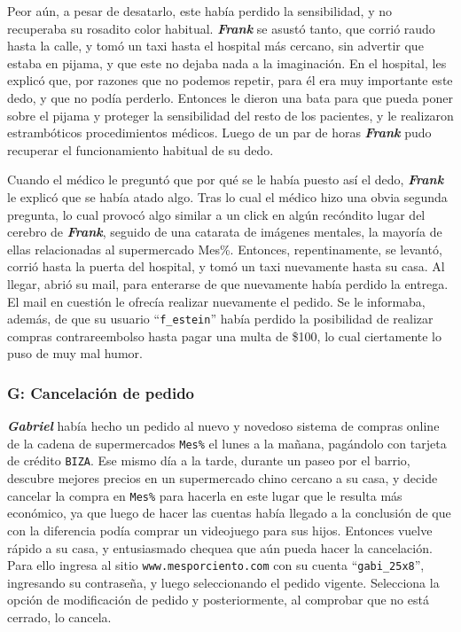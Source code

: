 Peor aún, a pesar de desatarlo, este había perdido la sensibilidad, y no
recuperaba su rosadito color habitual. \textbf{\emph{Frank}} se asustó tanto,
que corrió raudo hasta la calle, y tomó un taxi hasta el hospital más cercano,
sin advertir que estaba en pijama, y que este no dejaba nada a la imaginación.
En el hospital, les explicó que, por razones que no podemos repetir, para él
era muy importante este dedo, y que no podía perderlo. Entonces le dieron una
bata para que pueda poner sobre el pijama y proteger la sensibilidad del resto
de los pacientes, y le realizaron estrambóticos procedimientos médicos. Luego
de un par de horas \textbf{\emph{Frank}} pudo recuperar el funcionamiento
habitual de su dedo.

Cuando el médico le preguntó que por qué se le había puesto así el dedo,
\textbf{\emph{Frank}} le explicó que se había atado algo. Tras lo cual el
médico hizo una obvia segunda pregunta, lo cual provocó algo similar a un
click en algún recóndito lugar del cerebro de \textbf{\emph{Frank}}, seguido
de una catarata de imágenes mentales, la mayoría de ellas relacionadas al
supermercado Mes\%. Entonces, repentinamente, se levantó, corrió hasta la
puerta del hospital, y tomó un taxi nuevamente hasta su casa. Al llegar, abrió
su mail, para enterarse de que nuevamente había perdido la entrega. El mail en
cuestión le ofrecía realizar nuevamente el pedido. Se le informaba, además, de
que su usuario ``\texttt{f\_estein}'' había perdido la posibilidad de realizar
compras contrareembolso hasta pagar una multa de \$100, lo cual ciertamente lo
puso de muy mal humor.

\subsubsection{G: Cancelación de pedido}

\textbf{\emph{Gabriel}} había hecho un pedido al nuevo y novedoso sistema de
compras online de la cadena de supermercados \texttt{Mes\%} el lunes a la
mañana, pagándolo con tarjeta de crédito \texttt{BIZA}. Ese mismo día a la
tarde, durante un paseo por el barrio, descubre mejores precios en un
supermercado chino cercano a su casa, y decide cancelar la compra en
\texttt{Mes\%} para hacerla en este lugar que le resulta más económico, ya que
luego de hacer las cuentas había llegado a la conclusión de que con la
diferencia podía comprar un videojuego para sus hijos. Entonces vuelve rápido
a su casa, y entusiasmado chequea que aún pueda hacer la cancelación. Para
ello ingresa al sitio \texttt{www.mesporciento.com} con su cuenta
``\texttt{gabi\_25x8}'', ingresando su contraseña, y luego seleccionando el
pedido vigente. Selecciona la opción de modificación de pedido y
posteriormente, al comprobar que no está cerrado, lo cancela.

